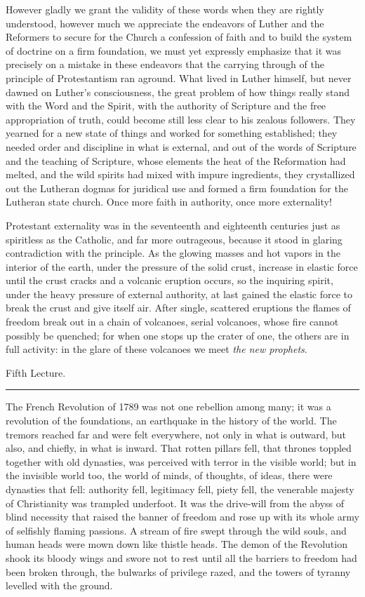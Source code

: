 \documentclass[12pt,a4paper,openany]{book}
\newcommand{\opage}[1]{\marginnote{\footnotesize\textit{[#1]}}}
\newcommand{\lecture}[1]{\clearpage\begin{center}{\large #1}\\[0.4em]\rule{3em}{0.4pt}\end{center}\medskip\noindent}
\begin{document}
However gladly we grant the validity of these
words when they are rightly understood, however much we
appreciate the endeavors of Luther and the Reformers
to secure for the Church a confession of faith and to build
the system of doctrine on a firm foundation, we must yet
expressly emphasize that it was precisely on a mistake
in these endeavors that the carrying through of the principle of Protestantism
ran aground. What lived in
Luther himself, but never dawned on Luther's consciousness,
the great problem of how things really stand
with the Word and the Spirit, with the authority of Scripture and
the free appropriation of truth, could become still less
clear to his zealous followers. They yearned
for a new state of things and worked for something established;
they needed order and discipline in what is external, and out of
the words of Scripture and the teaching of Scripture, whose elements the
heat of the Reformation had melted, and the wild spirits
had mixed with impure ingredients, they crystallized out the
Lutheran dogmas for juridical use and formed a firm
\setcounter{footnote}{0}%
\opage{77}foundation for the Lutheran state church. Once more faith in authority,
once more externality!

Protestant externality was in the seventeenth
and eighteenth centuries just as spiritless as the
Catholic, and far more outrageous, because it stood in
glaring contradiction with the principle. As the
glowing masses and hot vapors in the interior of the earth, under
the pressure of the solid crust, increase in elastic force until
the crust cracks and a volcanic eruption occurs, so
the inquiring spirit, under the heavy pressure
of external authority, at last gained the elastic force to
break the crust and give itself air. After single, scattered
eruptions the flames of freedom break out in a chain of
volcanoes, serial volcanoes, whose fire cannot possibly be quenched;
for when one stops up the crater of one, the
others are in full activity: in the glare of these volcanoes
we meet \emph{the new prophets}.

\setcounter{footnote}{0}%
\lecture{Fifth Lecture.}\opage{78}The French Revolution of 1789 was not one rebellion
among many; it was a revolution of the foundations,
an earthquake in the history of the world. The tremors reached
far and were felt everywhere, not only in what is outward,
but also, and chiefly, in what is inward. That
rotten pillars fell, that thrones toppled together with old dynasties,
was perceived with terror in the visible world;
but in the invisible world too, the world of minds, of thoughts, of ideas,
there were dynasties that fell: authority fell,
legitimacy fell, piety fell, the venerable
majesty of Christianity was trampled underfoot. It was
the drive-will from the abyss of blind necessity
that raised the banner of freedom and rose up with its
whole army of selfishly flaming passions. A stream of fire
swept through the wild souls, and human heads
were mown down like thistle heads. The demon of the Revolution
shook its bloody wings and swore not to rest until
all the barriers to freedom had been broken through, the bulwarks
of privilege razed, and the towers of tyranny
levelled with the ground.
\end{document}
